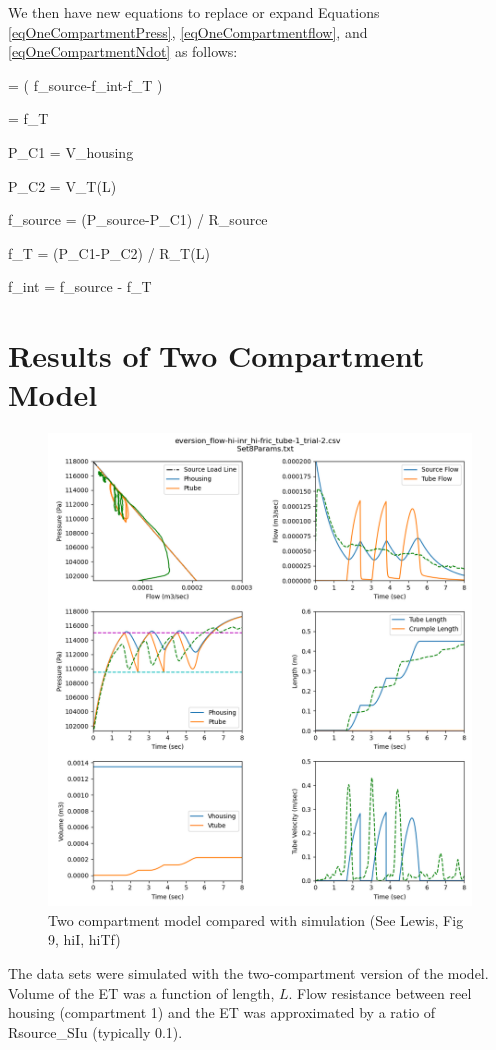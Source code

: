 \documentclass[letterpaper]{article}
\begin{document}
We then have new equations to replace or expand Equations \ref{eqOneCompartmentPress}, \ref{eqOneCompartmentflow}, and \ref{eqOneCompartmentNdot}
as follows:

\beq
{} = ( f_{source}-f_{int}-f_T ) \cdot {}
\eeq

\beq
{} =   f_T \cdot {}
\eeq

\beq
P_{C1} =   {V_{housing}}
\eeq

\beq
P_{C2} =   {V_T(L)}
\eeq

\beq
f_{source} = (P_{source}-P_{C1}) /  R_{source}
\eeq

\beq
f_{T} = (P_{C1}-P_{C2}) /  R_{T}(L)
\eeq

\beq
f_{int} = f_{source} - f_T
\eeq

\section{Results of Two Compartment Model}

\begin{figure}[h]\centering
\includegraphics[width=.75\textwidth]{2CompSimulationSet8.png}
\caption{Two compartment model compared with simulation (See Lewis, Fig 9, hiI, hiTf)}
\label{Fig:2Comp}
\end{figure}


The data sets were simulated with the two-compartment version of the model.  Volume of the ET was
a function of length, $L$.  Flow resistance between reel housing (compartment 1) and
the ET was approximated by a ratio of Rsource\_SIu (typically 0.1).
\end{document}
